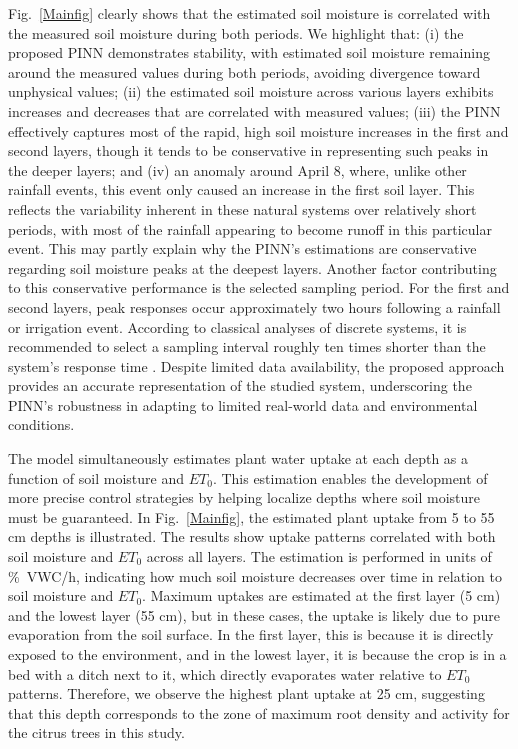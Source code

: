 \documentclass[pdflatex,sn-nature]{sn-jnl}%
\theoremstyle{thmstyleone}%
\theoremstyle{thmstyletwo}%
\theoremstyle{thmstylethree}%
\begin{document}
Fig.~\ref{Mainfig} clearly shows that the estimated soil moisture is correlated with the measured soil moisture during both periods. We highlight that: (i) the proposed PINN demonstrates stability, with estimated soil moisture remaining around the measured values during both periods, avoiding divergence toward unphysical values; (ii) the estimated soil moisture across various layers exhibits increases and decreases that are correlated with measured values; (iii) the PINN effectively captures most of the rapid, high soil moisture increases in the first and second layers, though it tends to be conservative in representing such peaks in the deeper layers; and (iv) an anomaly around April 8, where, unlike other rainfall events, this event only caused an increase in the first soil layer. This reflects the variability inherent in these natural systems over relatively short periods, with most of the rainfall appearing to become runoff in this particular event. This may partly explain why the PINN’s estimations are conservative regarding soil moisture peaks at the deepest layers. Another factor contributing to this conservative performance is the selected sampling period. For the first and second layers, peak responses occur approximately two hours following a rainfall or irrigation event. According to classical analyses of discrete systems, it is recommended to select a sampling interval roughly ten times shorter than the system's response time \cite{Franklin1998}. Despite limited data availability, the proposed approach provides an accurate representation of the studied system, underscoring the PINN's robustness in adapting to limited real-world data and environmental conditions.

The model simultaneously estimates plant water uptake at each depth as a function of soil moisture and $ET_0$. This estimation enables the development of more precise control strategies by helping localize depths where soil moisture must be guaranteed. In Fig.~\ref{Mainfig}, the estimated plant uptake from 5 to  55 \si{cm} depths is illustrated. The results show uptake patterns correlated with both soil moisture and $ET_0$ across all layers. The estimation is performed in units of \si{\%VWC/h}, indicating how much soil moisture decreases over time in relation to soil moisture and $ET_0$. Maximum uptakes are estimated at the first layer (5 \si{cm}) and the lowest layer (55 \si{cm}), but in these cases, the uptake is likely due to pure evaporation from the soil surface. In the first layer, this is because it is directly exposed to the environment, and in the lowest layer, it is because the crop is in a bed with a ditch next to it, which directly evaporates water relative to $ET_0$ patterns. Therefore, we observe the highest plant uptake at 25 \si{cm}, suggesting that this depth corresponds to the zone of maximum root density and activity for the citrus trees in this study.
\end{document}
